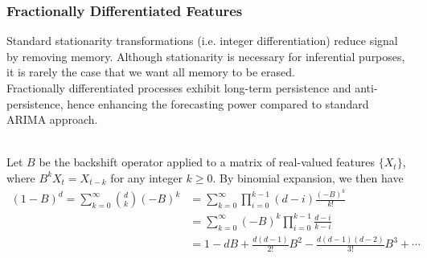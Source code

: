 \subsubsection{Fractionally Differentiated Features}

Standard stationarity transformations (i.e. integer differentiation) reduce signal by removing memory. Although stationarity is necessary for inferential purposes, it is rarely the case that we want all memory to be erased.\\
Fractionally differentiated processes exhibit long-term persistence and anti-persistence, hence enhancing the forecasting power compared to standard ARIMA approach.

\begin{definition} \\
Let $B$ be the backshift operator applied to a matrix of real-valued features $\{X_t \}$, where $B^k X_t = X_{t-k}$ for any integer $k \geq 0$. By binomial expansion, we then have
\begin{align}
(1-B)^d = \sum\limits_{k=0}^{\infty} \binom{d}{k} (-B)^k &= \sum\limits_{k=0}^{\infty} \prod\limits_{i=0}^{k-1} (d-i) \frac{(-B)^k}{k!} \nonumber \\
&= \sum\limits_{k=0}^{\infty} (-B)^k \prod\limits_{i=0}^{k-1} \frac{d-i}{k-i} \nonumber \\
&= 1 - dB + \frac{d(d-1)}{2!} B^2 - \frac{d(d-1)(d-2)}{3!} B^3 + \cdots \nonumber 
\end{align}
\end{definition}

